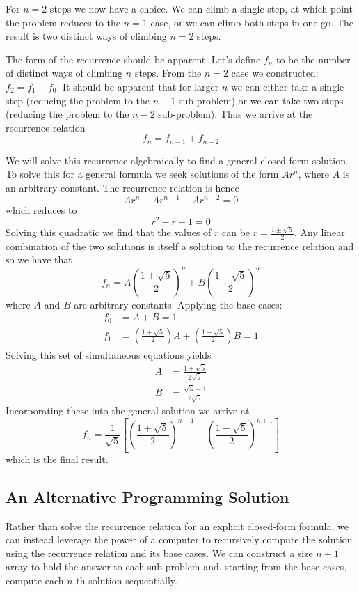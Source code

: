 \documentclass[12pt]{article}
\begin{document}
For $n=2$ steps we now have a choice. We can climb a single step, at which point the problem reduces to the $n=1$ case, or we can climb both steps in one go. The result is two distinct ways of climbing $n=2$ steps.

The form of the recurrence should be apparent. Let's define $f_n$ to be the number of distinct ways of climbing $n$ steps. From the $n=2$ case we constructed: $f_2 = f_1 + f_0$. It should be apparent that for larger $n$ we can either take a single step (reducing the problem to the $n-1$ sub-problem) or we can take two steps (reducing the problem to the $n-2$ sub-problem). Thus we arrive at the recurrence relation
\[
f_n = f_{n-1} + f_{n-2}
\]

We will solve this recurrence algebraically to find a general closed-form solution. To solve this for a general formula we seek solutions of the form $Ar^n$, where $A$ is an arbitrary constant. The recurrence relation is hence
\[Ar^n - Ar^{n-1} - Ar^{n-2} = 0\]
which reduces to
\[r^2-r-1=0\]
Solving this quadratic we find that the values of $r$ can be \(r=\frac{1\pm \sqrt{5}}{2}\). Any linear combination of the two solutions is itself a solution to the recurrence relation and so we have that
\[f_n = A\left(\frac{1+\sqrt{5}}{2}\right)^n + B\left(\frac{1-\sqrt{5}}{2}\right)^n\]
where $A$ and $B$ are arbitrary constants. Applying the base cases:
\begin{align*}
f_0 &= A + B = 1\\
f_1 &= \left(\frac{1+\sqrt{5}}{2}\right)A + \left(\frac{1-\sqrt{5}}{2}\right)B = 1
\end{align*}
Solving this set of simultaneous equations yields
\begin{align*}
A &= \frac{1+\sqrt{5}}{2\sqrt{5}}\\
B &= \frac{\sqrt{5} - 1}{2\sqrt{5}}
\end{align*}
Incorporating these into the general solution we arrive at
\[
f_n = \frac{1}{\sqrt{5}}\left[ \left(\frac{1+\sqrt{5}}{2}\right)^{n+1} - \left(\frac{1-\sqrt{5}}{2}\right)^{n+1}\right]
\]
which is the final result.

\subsection*{An Alternative Programming Solution}
Rather than solve the recurrence relation for an explicit closed-form formula, we can instead leverage the power of a computer to recursively compute the solution using the recurrence relation and its base cases.
We can construct a size $n+1$ array to hold the answer to each sub-problem and, starting from the base cases, compute each $n$-th solution sequentially.
\end{document}
